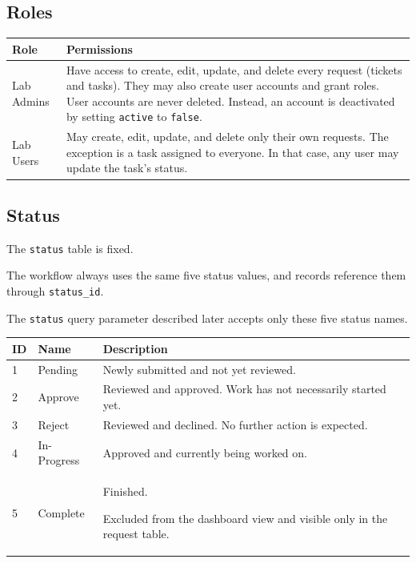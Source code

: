 \documentclass[11pt,a4paper]{article}
\begin{document}
\subsection{Roles}

\begin{longtable}{@{}p{4.0cm}p{12.18cm}@{}}
\toprule
\textbf{Role} & \textbf{Permissions} \\
\midrule
\endhead

Lab Admins &
Have access to create, edit, update, and delete every request
(tickets and tasks). They may also create user accounts and grant roles.
User accounts are never deleted. Instead, an account is
deactivated by setting \texttt{active} to \texttt{false}.
\\[6pt]

Lab Users & May create, edit, update, and delete only their own requests.
The exception is a task assigned to everyone. In that case,
any user may update the task's status.
\\

\bottomrule
\end{longtable}


\subsection{Status}

The \texttt{status} table is fixed.

The workflow always uses the same five status values, and
records reference them through \texttt{status\_id}.

The \texttt{status} query parameter described later accepts
only these five status names.

\begin{longtable}{@{}p{1.4cm}p{3.0cm}p{11.36cm}@{}}
\toprule
\textbf{ID} & \textbf{Name} & \textbf{Description} \\
\midrule
\endhead

1 & Pending &
Newly submitted and not yet reviewed.
\\

2 & Approve &
Reviewed and approved. Work has not necessarily started yet.
\\

3 & Reject &
Reviewed and declined. No further action is expected.
\\

4 & In-Progress &
Approved and currently being worked on.
\\

5 & Complete &
Finished.

Excluded from the dashboard view and visible only in the
request table.
\\

\bottomrule
\end{longtable}
\end{document}
